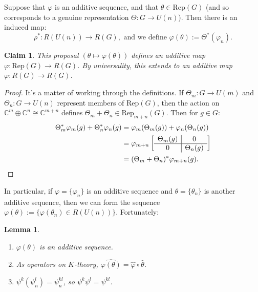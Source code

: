 \documentclass{article}
\newcommand{\C}{\mathbb{C}}
\newcommand{\from}{\leftarrow}
\renewcommand{\to}{\longrightarrow}
\renewcommand{\mapsto}{\longmapsto}
\newtheorem{lem}[thm]{Lemma}
\newtheorem{claim}[thm]{Claim}
\theoremstyle{definition}
\begin{document}
%
Suppose that $\varphi$ is an additive sequence, and that $\theta\in \mathrm{Rep}(G)$ (and so corresponds to a genuine representation $\Theta:G\to U(n)$). Then there is an induced map:
\[\rho^*:R(U(n))\to R(G),\text{ and we define }\varphi(\theta):=\Theta^*(\varphi_{n}).\]

\begin{claim}
This proposal $(\theta\mapsto \varphi(\theta))$ defines an additive map $\varphi:\mathrm{Rep}(G) \to R(G)$. By universality, this extends to an additive map $\varphi:R(G)\to R(G)$.
\end{claim}
\begin{proof}
It's a matter of working through the definitions.  If $\Theta_m: G \to U(m)$ and $\Theta_n: G \to U(n)$ represent members of $\mathrm{Rep}(G)$, then the action on $\C^m \oplus \C^n \cong \C^{m+n}$ defines $\Theta_m + \Theta_n \in \mathrm{Rep}_{m+n}(G)$.  Then for $g\in G$:
\begin{align*}
\Theta^*_m \varphi_m(g) + \Theta_n^* \varphi_n(g) & = \varphi_m(\Theta_m (g)) + \varphi_n(\Theta_n (g)) \\
& = \varphi_{m+n} \left[ \begin{array}{c|c} \Theta_m (g) & 0 \\ \hline 0 & \Theta_n (g) \end{array} \right] \\
& = (\Theta_m + \Theta_n)^* \varphi_{m+n} (g).\qedhere
\end{align*}
\end{proof}
\noindent In particular, if $\varphi = \{\varphi_n\}$ is an additive sequence and $\theta = \{ \theta_n \}$ is another additive sequence, then we can form the sequence $\varphi(\theta) := \{ \varphi(\theta_n) \in R(U(n))\}$. Fortunately:
\begin{lem}\hfil
\begin{enumerate}
\item[\textup{1}.] $\varphi(\theta)$ is an additive sequence.
\item[\textup{2}.] As operators on $K$-theory, $\widehat{\varphi(\theta)} = \hat \varphi \circ \hat \theta$.
\item[\textup{3}.] $\psi^k(\psi^l_n) = \psi^{kl}_n$, so $\psi^k \psi^l = \psi^{kl}$.
\end{enumerate}
\end{lem}
\end{document}
